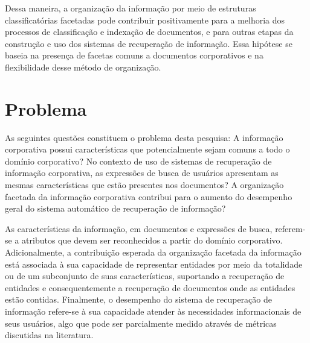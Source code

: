 Dessa maneira, a organização da informação por meio de estruturas classificatórias facetadas pode contribuir positivamente para a melhoria dos processos de classificação e indexação de documentos, e para outras etapas da construção e uso dos sistemas de recuperação de informação. Essa hipótese se baseia na presença de facetas comuns a documentos corporativos e na flexibilidade desse método de organização.









\section{Problema}

As seguintes questões constituem o problema desta pesquisa: 
A informação corporativa possui características que potencialmente sejam comuns a todo o domínio corporativo? 
No contexto de uso de sistemas de recuperação de informação corporativa, as expressões de busca de usuários apresentam as mesmas características que estão presentes nos documentos? 
A organização facetada da informação corporativa contribui para o aumento do desempenho geral do sistema automático de recuperação de informação?

As características da informação, em documentos e expressões de busca, referem-se a atributos que devem ser reconhecidos a partir do domínio corporativo. Adicionalmente, a contribuição esperada da organização facetada da informação está associada à sua capacidade de representar entidades por meio da totalidade ou de um subconjunto de suas características, suportando a recuperação de entidades e consequentemente a recuperação de documentos onde as entidades estão contidas. Finalmente, o desempenho do sistema de recuperação de informação refere-se à sua capacidade atender às necessidades informacionais de seus usuários, algo que pode ser parcialmente medido através de métricas discutidas na literatura.

